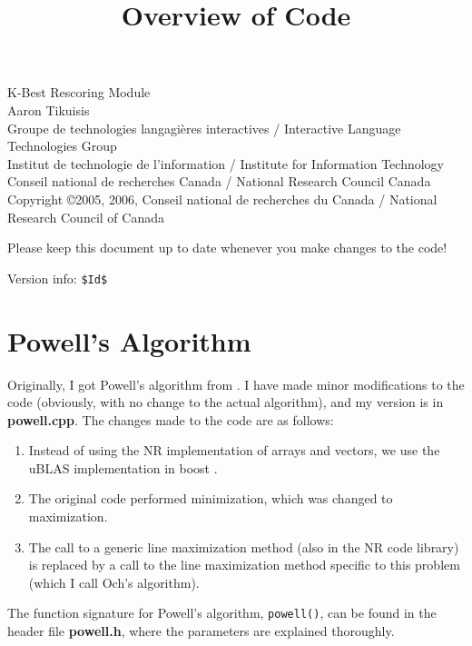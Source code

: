 \documentclass[12pt]{amsart}
\newcommand{\file}{\textbf} \newcommand{\url}{\underline}
\newcommand{\code}[1]{{\small \texttt{#1}}}
\begin{document}
\title{Overview of Code} \maketitle

{\tiny
  \noindent K-Best Rescoring Module\\ Aaron Tikuisis\\ Groupe de technologies
  langagi{\`e}res interactives / Interactive Language Technologies Group\\ Institut
  de technologie de l'information / Institute for Information Technology\\
  Conseil national de recherches Canada / National Research Council Canada\\
  Copyright \copyright 2005, 2006, Conseil national de recherches du Canada / 
     National Research Council of Canada
}

\noindent
Please keep this document up to date whenever you make changes to the code!

{\tiny
\noindent
Version info: \verb+$Id$+
}
\\

\section*{Powell's Algorithm}

Originally, I got Powell's algorithm from \cite{NR-C++}.  I have made minor
modifications to the code (obviously, with no change to the actual algorithm),
and my version is in \file{powell.cpp}.  The changes made to the code are
as follows:

\begin{enumerate}
\item Instead of using the NR implementation of arrays and vectors, we use the
      uBLAS implementation in boost \cite{uBLAS}.

\item The original code performed minimization, which was changed to
      maximization.

\item The call to a generic line maximization method (also in the NR code
      library) is replaced by a call to the line maximization method specific
      to this problem (which I call Och's algorithm).
\end{enumerate}

The function signature for Powell's algorithm, \code{powell()}, can be found in
the header file \file{powell.h}, where the parameters are explained thoroughly.
\end{document}
